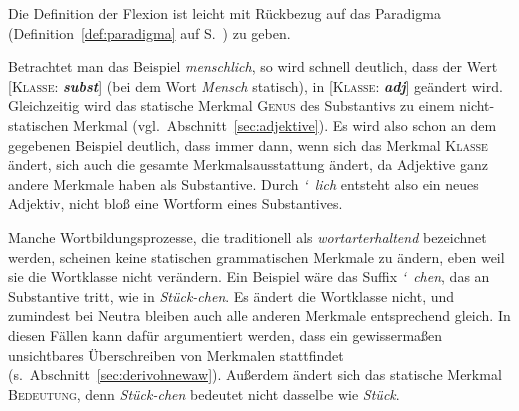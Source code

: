 
Die Definition der Flexion ist leicht mit Rückbezug auf das Paradigma (Definition~\ref{def:paradigma} auf S.~\pageref{def:paradigma}) zu geben.


Betrachtet man das Beispiel \textit{menschlich}, so wird schnell deutlich, dass der Wert [\textsc{Klasse}: \textit{\textbf{subst}}] (bei dem Wort \textit{Mensch} statisch), in [\textsc{Klasse}: \textit{\textbf{adj}}] geändert wird.
Gleichzeitig wird das statische Merkmal \textsc{Genus} des Substantivs zu einem nicht-statischen Merkmal (vgl.\ Abschnitt~\ref{sec:adjektive}).
Es wird also schon an dem gegebenen Beispiel deutlich, dass immer dann, wenn sich das Merkmal \textsc{Klasse} ändert, sich auch die gesamte Merkmalsausstattung ändert, da Adjektive \zB ganz andere Merkmale haben als Substantive.
Durch \mbox{\textit{\char`~lich}} entsteht also ein neues Adjektiv, nicht bloß eine Wortform eines Substantives.

Manche Wortbildungsprozesse, die traditionell als \textit{wortarterhaltend} bezeichnet werden, scheinen keine statischen grammatischen Merkmale zu ändern, eben weil sie die Wortklasse nicht verändern.
Ein Beispiel wäre das Suffix \mbox{\textit{\char`~chen}}, das an Substantive tritt, wie in \textit{Stück-chen}.
Es ändert die Wortklasse nicht, und zumindest bei Neutra bleiben auch alle anderen Merkmale entsprechend gleich.
In diesen Fällen kann dafür argumentiert werden, dass ein gewissermaßen unsichtbares Überschreiben von Merkmalen stattfindet (s.\ Abschnitt~\ref{sec:derivohnewaw}).
Außerdem ändert sich das statische Merkmal \textsc{Bedeutung}, denn \textit{Stück-chen} bedeutet nicht dasselbe wie \textit{Stück}.

